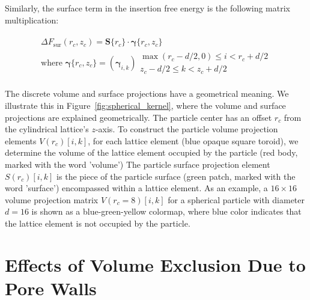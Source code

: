 \documentclass[10pt, a4paper]{article}
\begin{document}
\begin{multicols}{2}
Similarly, the surface term in the insertion free energy is the following matrix multiplication:

\begin{eqnarray}
    \begin{split}
        \Delta F_{\textrm{sur}}(r_c, z_c) = \bm{S}\{r_c\} \cdot \bm{\gamma}\{r_c, z_c\} \\[5pt]
        \text{where } \bm{\gamma}\{r_c,z_c\} =\left(\bm{\gamma}_{i,k}\right) {\substack{\max(r_c-d/2,0) \le i < r_c+d/2 \\ z_c-d/2 \le k < z_c+d/2}}
    \end{split}
\end{eqnarray}

The discrete volume and surface projections have a geometrical meaning.
We illustrate this in Figure~\ref{fig:spherical_kernel}, where the volume and surface projections are explained geometrically.
The particle center has an offset $r_c$ from the cylindrical lattice's $z$-axis.
To construct the particle volume projection elements $V(r_c)[i, k]$, for each lattice element (blue opaque square toroid), we determine the volume of the lattice element occupied by the particle (red body, marked with the word 'volume')
The particle surface projection element $S(r_c)[i, k]$ is the piece of the particle surface (green patch, marked with the word 'surface') encompassed within a lattice element.
As an example, a $16 \times 16$ volume projection matrix $V(r_c = 8)[i, k]$ for a spherical particle with diameter $d = 16$ is shown as a blue-green-yellow colormap, where blue color indicates that the lattice element is not occupied by the particle.


\end{multicols}

\pagebreak
\section{Effects of Volume Exclusion Due to Pore Walls}
\end{document}
